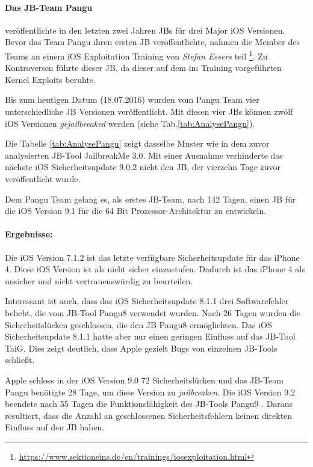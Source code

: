 \paragraph{Das JB-Team Pangu} veröffentlichte in den letzten zwei Jahren JBs für drei Major iOS Versionen. Bevor das Team Pangu ihren ersten JB veröffentlichte, nahmen die Member des Teams an einem iOS Exploitation Training von \textit{\glqq Stefan Essers\grqq{}} teil \footnote{\url{https://www.sektioneins.de/en/trainings/iosexploitation.html}}. Zu Kontroversen führte dieser JB, da dieser auf dem im Training vorgeführten Kernel Exploits beruhte.\par
Bis zum heutigen Datum (18.07.2016) wurden vom Pangu Team vier unterschiedliche JB Versionen veröffentlicht. Mit diesen vier JBs können zwölf iOS Versionen \textit{\glqq gejailbreaked\grqq{}} werden (siehe Tab.\ref{tab:AnalysePangu}).

Die Tabelle \ref{tab:AnalysePangu} zeigt dasselbe Muster wie in dem zuvor analysierten JB-Tool JailbreakMe 3.0. Mit einer Ausnahme verhinderte das nächste iOS Sicherheitsupdate 9.0.2 nicht den JB, der vierzehn Tage zuvor veröffentlicht wurde. \par 
Dem Pangu Team gelang es, als erstes JB-Team, nach 142 Tagen, einen JB für die iOS Version 9.1 für die 64 Bit Prozessor-Architektur zu entwickeln.

\paragraph{Ergebnisse:}  Die iOS Version 7.1.2 ist das letzte verfügbare Sicherheitsupdate für das iPhone 4. Diese iOS Version ist als nicht sicher einzustufen. Dadurch ist das iPhone 4 als unsicher und nicht vertrauenswürdig zu beurteilen.\par 
Interessant ist auch, dass das iOS Sicherheitsupdate 8.1.1 drei Softwarefehler behebt, die vom JB-Tool Pangu8 verwendet wurden. Nach 26 Tagen wurden die Sicherheitslücken geschlossen, die den JB Pangu8 ermöglichten. Das iOS Sicherheitsupdate 8.1.1 hatte aber nur einen geringen Einfluss auf das JB-Tool TaiG. Dies zeigt deutlich, dass Apple gezielt Bugs von einzelnen JB-Tools schließt. 

Apple schloss in der iOS Version 9.0 72 Sicherheitslücken und das JB-Team Pangu benötigte 28 Tage, um diese Version zu \textit{\glqq jailbreaken\grqq{}}. Die iOS Version 9.2 beendete nach 55 Tagen die Funktionsfähigkeit des JB-Tools Pangu9 . Daraus resultiert, dass die Anzahl an geschlossenen Sicherheitsfehlern keinen direkten Einfluss auf den JB haben.

